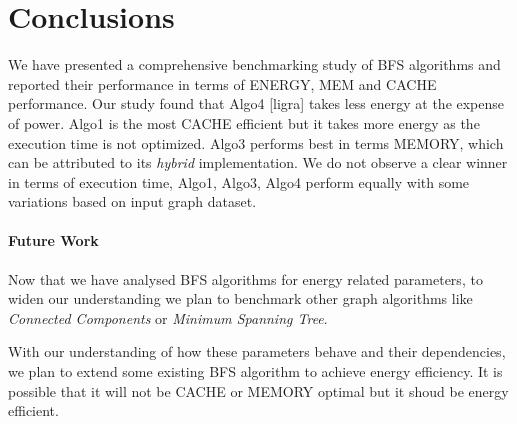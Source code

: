 \section{Conclusions}
\label{conc}

%
%
%

We have presented a comprehensive benchmarking study of BFS algorithms
and reported their performance in terms of ENERGY, MEM and CACHE
performance.  Our study found that Algo4 [ligra] takes less energy at the
expense of power.  Algo1 is the most CACHE efficient but it takes more
energy as the execution time is not optimized.  Algo3 performs best in
terms MEMORY, which can be attributed to its \emph{hybrid}
implementation.  We do not observe a clear winner in terms of
execution time,  Algo1, Algo3, Algo4 perform equally with some
variations based on input graph dataset.

\paragraph{Future Work}
Now that we have analysed BFS algorithms for energy related
parameters, to widen our understanding we plan to benchmark other
graph algorithms like \emph{Connected Components} or \emph{Minimum
Spanning Tree}.

With our understanding of how these parameters behave and their
dependencies, we plan to extend some existing BFS algorithm to achieve
energy efficiency.  It is possible that it will not be CACHE or MEMORY
optimal but it shoud be energy efficient.


%
%
%
%
%
%
%

